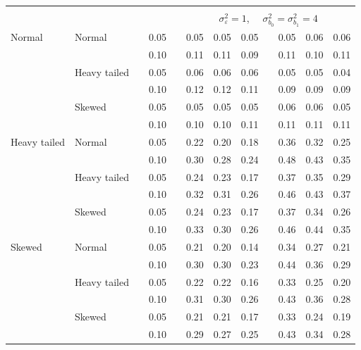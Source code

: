 \documentclass[12pt]{article} %
\begin{document}
\begin{table}[ht]
\begin{scriptsize}
\begin{center}
\begin{tabular}{ll p{.1cm} c p{.1cm} rrr p{.1cm} rrr}
&&&&&&&&&&&\\
& && && \multicolumn{7}{c}{$\sigma_{\varepsilon}^2 = 1$, \ \ $\sigma_{b_0}^2 = \sigma_{b_1}^2 = 4$} \\ \cline{6-12}
Normal       & Normal       && 0.05 &&   0.05 & 0.05 & 0.05 && 0.05 & 0.06 & 0.06 \\ 
             &              && 0.10 &&   0.11 & 0.11 & 0.09 && 0.11 & 0.10 & 0.11 \\ 
             & Heavy tailed && 0.05 &&   0.06 & 0.06 & 0.06 && 0.05 & 0.05 & 0.04 \\ 
             &              && 0.10 &&   0.12 & 0.12 & 0.11 && 0.09 & 0.09 & 0.09 \\ 
             & Skewed       && 0.05 &&   0.05 & 0.05 & 0.05 && 0.06 & 0.06 & 0.05 \\ 
             &              && 0.10 &&   0.10 & 0.10 & 0.11 && 0.11 & 0.11 & 0.11 \\ 
Heavy tailed & Normal       && 0.05 &&   0.22 & 0.20 & 0.18 && 0.36 & 0.32 & 0.25 \\ 
             &              && 0.10 &&   0.30 & 0.28 & 0.24 && 0.48 & 0.43 & 0.35 \\ 
             & Heavy tailed && 0.05 &&   0.24 & 0.23 & 0.17 && 0.37 & 0.35 & 0.29 \\ 
             &              && 0.10 &&   0.32 & 0.31 & 0.26 && 0.46 & 0.43 & 0.37 \\ 
             & Skewed       && 0.05 &&   0.24 & 0.23 & 0.17 && 0.37 & 0.34 & 0.26 \\ 
             &              && 0.10 &&   0.33 & 0.30 & 0.26 && 0.46 & 0.44 & 0.35 \\ 
Skewed       & Normal       && 0.05 &&   0.21 & 0.20 & 0.14 && 0.34 & 0.27 & 0.21 \\ 
             &              && 0.10 &&   0.30 & 0.30 & 0.23 && 0.44 & 0.36 & 0.29 \\ 
             & Heavy tailed && 0.05 &&   0.22 & 0.22 & 0.16 && 0.33 & 0.25 & 0.20 \\ 
             &              && 0.10 &&   0.31 & 0.30 & 0.26 && 0.43 & 0.36 & 0.28 \\ 
             & Skewed       && 0.05 &&   0.21 & 0.21 & 0.17 && 0.33 & 0.24 & 0.19 \\ 
             &              && 0.10 &&   0.29 & 0.27 & 0.25 && 0.43 & 0.34 & 0.28 \\ 

\hline
\end{tabular}
\end{center}
\end{scriptsize}
\end{table}
\end{document}
